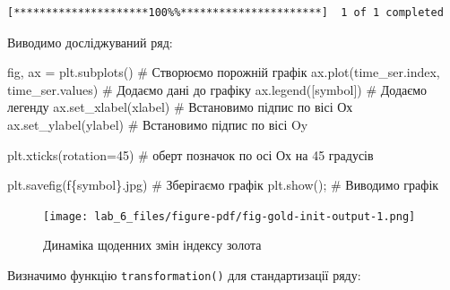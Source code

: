 \documentclass[
  letterpaper,
]{report}
\newenvironment{Shaded}{\begin{snugshade}}{\end{snugshade}}
\newcommand{\CommentTok}[1]{\textcolor[rgb]{0.37,0.37,0.37}{#1}}
\newcommand{\DecValTok}[1]{\textcolor[rgb]{0.68,0.00,0.00}{#1}}
\newcommand{\NormalTok}[1]{\textcolor[rgb]{0.00,0.23,0.31}{#1}}
\newcommand{\OperatorTok}[1]{\textcolor[rgb]{0.37,0.37,0.37}{#1}}
\newcommand{\SpecialCharTok}[1]{\textcolor[rgb]{0.37,0.37,0.37}{#1}}
\newcommand{\SpecialStringTok}[1]{\textcolor[rgb]{0.13,0.47,0.30}{#1}}
\begin{document}
\begin{verbatim}
[*********************100%%**********************]  1 of 1 completed
\end{verbatim}

Виводимо досліджуваний ряд:

\begin{Shaded}
\begin{Highlighting}[]
\NormalTok{fig, ax }\OperatorTok{=}\NormalTok{ plt.subplots()                   }\CommentTok{\# Створюємо порожній графік}
\NormalTok{ax.plot(time\_ser.index, time\_ser.values)   }\CommentTok{\# Додаємо дані до графіку}
\NormalTok{ax.legend([symbol])                        }\CommentTok{\# Додаємо легенду}
\NormalTok{ax.set\_xlabel(xlabel)                      }\CommentTok{\# Встановимо підпис по вісі Ох}
\NormalTok{ax.set\_ylabel(ylabel)                      }\CommentTok{\# Встановимо підпис по вісі Oy}

\NormalTok{plt.xticks(rotation}\OperatorTok{=}\DecValTok{45}\NormalTok{)                    }\CommentTok{\# оберт позначок по осі Ох на 45 градусів}

\NormalTok{plt.savefig(}\SpecialStringTok{f\textquotesingle{}}\SpecialCharTok{\{}\NormalTok{symbol}\SpecialCharTok{\}}\SpecialStringTok{.jpg\textquotesingle{}}\NormalTok{)               }\CommentTok{\# Зберігаємо графік }
\NormalTok{plt.show()}\OperatorTok{;}                                \CommentTok{\# Виводимо графік}
\end{Highlighting}
\end{Shaded}

\begin{figure}[H]

{\centering \texttt{[image: lab\_6\_files/figure-pdf/fig-gold-init-output-1.png]}

}

\caption{\label{fig-gold-init}Динаміка щоденних змін індексу золота}

\end{figure}

Визначимо функцію \texttt{transformation()} для стандартизації ряду:
\end{document}
